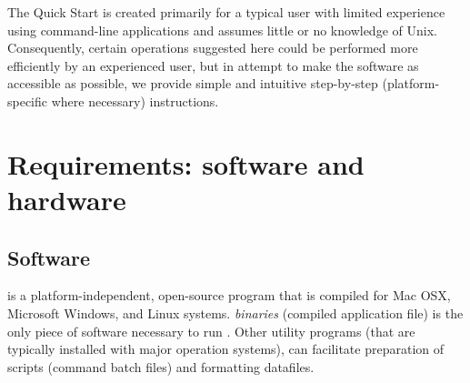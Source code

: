 The Quick Start is created primarily for a typical user with limited experience using command-line applications and assumes little or no knowledge of Unix. Consequently, certain operations suggested here could be performed more efficiently by an experienced user, but in attempt to make the software as accessible as possible, we provide simple and intuitive step-by-step (platform-specific where necessary) instructions. 

\section{Requirements: software and hardware}

\subsection{Software}
\poy is a platform-independent, open-source program that is compiled for Mac OSX, Microsoft Windows, and Linux systems. \poy \emph{binaries} (compiled application file) is the only piece of software necessary to run \poy. Other utility programs (that are typically installed with major operation systems), can facilitate preparation of \poy scripts (\poy command batch files) and formatting datafiles.


